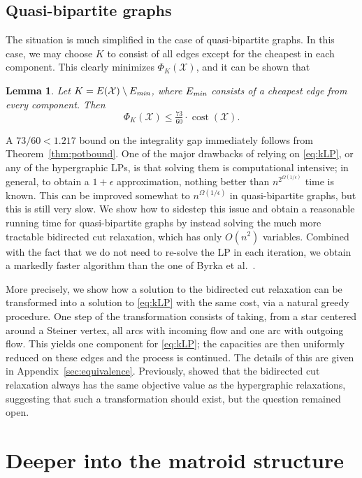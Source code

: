 \documentclass[11pt, letterpaper]{article}
\newtheorem{lemma}[theorem]{Lemma}
\theoremstyle{definition}
\DeclareMathOperator{\cost}{cost}
\newcommand{\grphx}{\mathcal{X}}
\newcommand{\core}{K}
\newcommand{\pot}[2]{\Phi_{#1}(#2)}
\newcommand{\Pot}{\pot{\core}{\grphx}}
\begin{document}
\subsection{Quasi-bipartite graphs}
The situation is much simplified in the case of quasi-bipartite graphs. In this case, we may choose $\core$ to consist of all edges except for the cheapest in each component. This clearly minimizes $\Pot$, and it can be shown that
\begin{lemma}\label{lem:quasi}
	Let $\core = E(\grphx) \setminus E_{\text{\it min}}$, where $E_{\text{\it min}}$ consists of a cheapest edge from every component. Then 
	\[ \Pot \leq \tfrac{73}{60}\cdot\cost(\grphx). \]
\end{lemma}
A $73/60 < 1.217$ bound on the integrality gap immediately follows from Theorem~\ref{thm:potbound}.
One of the major drawbacks of relying on \eqref{eq:kLP}, or any of the hypergraphic LPs, is that solving them is computational intensive; in general, to obtain a $1+\epsilon$ approximation, nothing better than $n^{2^{\Omega(1/\epsilon)}}$ time is known.
This can be improved somewhat to $n^{\Omega(1/\epsilon)}$ in quasi-bipartite graphs, but this is still very slow.
We show how to sidestep this issue and obtain a reasonable running time for quasi-bipartite graphs by instead solving the much more tractable bidirected cut relaxation, which has only $O(n^2)$ variables.
Combined with the fact that we do not need to re-solve the LP in each iteration, we obtain a markedly faster algorithm than the one of Byrka et al.~\cite{byrka_2011_steiner}.

More precisely, we show how a solution to the bidirected cut relaxation can be transformed into a solution to \eqref{eq:kLP} with the same cost, via a natural greedy procedure.
One step of the transformation consists of taking, from a star centered around a Steiner vertex, all arcs with incoming flow and one arc with outgoing flow.
This yields one component for \eqref{eq:kLP}; the capacities are then uniformly reduced on these edges and the process is continued.
The details of this are given in Appendix~\ref{sec:equivalence}.
Previously, \cite{chakrabarty_2010_hypergraphic} showed that the bidirected cut relaxation always has the same objective value as the hypergraphic relaxations, suggesting that such a transformation should exist, but the question remained open. 







\section{Deeper into the matroid structure}\label{sec:deeper}
\end{document}
